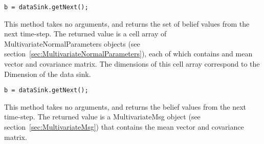 
\ifmatlab
\begin{lstlisting}
b = dataSink.getNext();
\end{lstlisting}

This method takes no arguments, and returns the set of belief values from the next time-step.  The returned value is a cell array of MultivariateNormalParameters objects (see section~\ref{sec:MultivariateNormalParameters}), each of which contains and mean vector and covariance matrix.  The dimensions of this cell array correspond to the Dimension of the data sink.
\fi

\ifjava
\begin{lstlisting}
b = dataSink.getNext();
\end{lstlisting}

This method takes no arguments, and returns the belief values from the next time-step.  The returned value is a MultivariateMsg object (see section~\ref{sec:MultivariateMsg}) that contains the mean vector and covariance matrix. 
\fi



